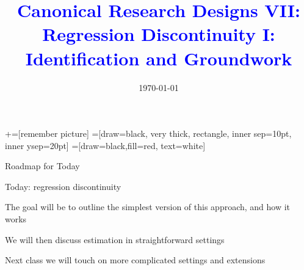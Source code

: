 \documentclass[notes,11pt, aspectratio=169]{beamer}
\title[]{\textcolor{blue}{Canonical Research Designs VII:\\ Regression
    Discontinuity I:\\ Identification and Groundwork}} \author[PGP]{}
\institute[FRBNY]{\small{\begin{tabular}{c}
                           Paul Goldsmith-Pinkham  \\
\end{tabular}}}
\date{\today}
\newenvironment{wideitemize}{\itemize\addtolength{\itemsep}{10pt}}{\enditemize}
\begin{document}
\newcommand\marktopleft[1]{%
    \tikz[overlay,remember picture] 
        \node (marker-#1-a) at (-.3em,.3em) {};%
}
\newcommand\markbottomright[2]{%
    \tikz[overlay,remember picture] 
        \node (marker-#1-b) at (0em,0em) {};%
}
+=[remember picture] 
 =[draw=black, very thick, rectangle, inner sep=10pt, inner ysep=20pt]
 =[draw=black,fill=red, text=white]

\begin{frame}
\maketitle
\end{frame}

\begin{frame}{Roadmap for Today}
  \begin{wideitemize}
  \item Today: regression discontinuity
  \item The goal will be to outline the simplest version of this
    approach, and how it works
  \item We will then discuss estimation in  straightforward
    settings
  \item Next class we will touch on more complicated settings and
    extensions
  \end{wideitemize}
\end{frame}
\end{document}
